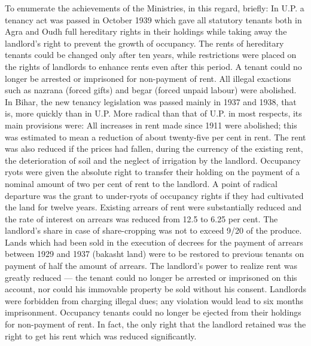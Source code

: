 \begin{multicols}{2}
To enumerate the achievements of the Ministries, in this regard, briefly: In U.P. a tenancy act was passed in October 1939 which gave all statutory tenants both in Agra and Oudh full hereditary rights in their holdings while taking away the landlord's right to prevent the growth of occupancy. The rents of hereditary tenants could be changed only after ten years, while restrictions were placed on the rights of landlords to enhance rents even after this period. A tenant could no longer be arrested or imprisoned for non-payment of rent. All illegal exactions such as nazrana (forced gifts) and begar (forced unpaid labour) were abolished. In Bihar, the new tenancy legislation was passed mainly in 1937 and 1938, that is, more quickly than in U.P. More radical than that of U.P. in most respects, its main provisions were: All increases in rent made since 1911 were abolished; this was estimated to mean a reduction of about twenty-five per cent in rent. The rent was also reduced if the prices had fallen, during the currency of the existing rent, the deterioration of soil and the neglect of irrigation by the landlord. Occupancy ryots were given the absolute right to transfer their holding on the payment of a nominal amount of two per cent of rent to the landlord. A point of radical departure was the grant to under-ryots of occupancy rights if they had cultivated the land for twelve years. Existing arrears of rent were substantially reduced and the rate of interest on arrears was reduced from 12.5 to 6.25 per cent. The landlord's share in case of share-cropping was not to exceed 9/20 of the produce. Lands which had been sold in the execution of decrees for the payment of arrears between 1929 and 1937 (bakasht land) were to be restored to previous tenants on payment of half the amount of arrears. The landlord's power to realize rent was greatly reduced --- the tenant could no longer be arrested or imprisoned on this account, nor could his immovable property be sold without his consent. Landlords were forbidden from charging illegal dues; any violation would lead to six months imprisonment. Occupancy tenants could no longer be ejected from their holdings for non-payment of rent. In fact, the only right that the landlord retained was the right to get his rent which was reduced significantly.


\end{multicols}
